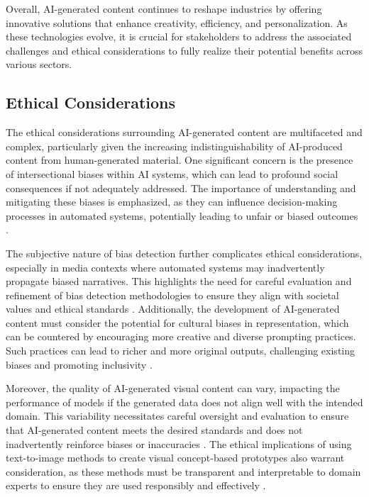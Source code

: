 Overall, AI-generated content continues to reshape industries by offering innovative solutions that enhance creativity, efficiency, and personalization. As these technologies evolve, it is crucial for stakeholders to address the associated challenges and ethical considerations to fully realize their potential benefits across various sectors.



\subsection{Ethical Considerations} \label{subsec:Ethical Considerations}

The ethical considerations surrounding AI-generated content are multifaceted and complex, particularly given the increasing indistinguishability of AI-produced content from human-generated material. One significant concern is the presence of intersectional biases within AI systems, which can lead to profound social consequences if not adequately addressed. The importance of understanding and mitigating these biases is emphasized, as they can influence decision-making processes in automated systems, potentially leading to unfair or biased outcomes . 



The subjective nature of bias detection further complicates ethical considerations, especially in media contexts where automated systems may inadvertently propagate biased narratives. This highlights the need for careful evaluation and refinement of bias detection methodologies to ensure they align with societal values and ethical standards \cite{spinde2021identificationbiasedtermsnews}. Additionally, the development of AI-generated content must consider the potential for cultural biases in representation, which can be countered by encouraging more creative and diverse prompting practices. Such practices can lead to richer and more original outputs, challenging existing biases and promoting inclusivity \cite{palmini2024patternscreativityuserinput}.



Moreover, the quality of AI-generated visual content can vary, impacting the performance of models if the generated data does not align well with the intended domain. This variability necessitates careful oversight and evaluation to ensure that AI-generated content meets the desired standards and does not inadvertently reinforce biases or inaccuracies \cite{jang2024visualdeltageneratorlarge}. The ethical implications of using text-to-image methods to create visual concept-based prototypes also warrant consideration, as these methods must be transparent and interpretable to domain experts to ensure they are used responsibly and effectively \cite{chiaburu2024copronnconceptbasedprototypicalnearest}.



